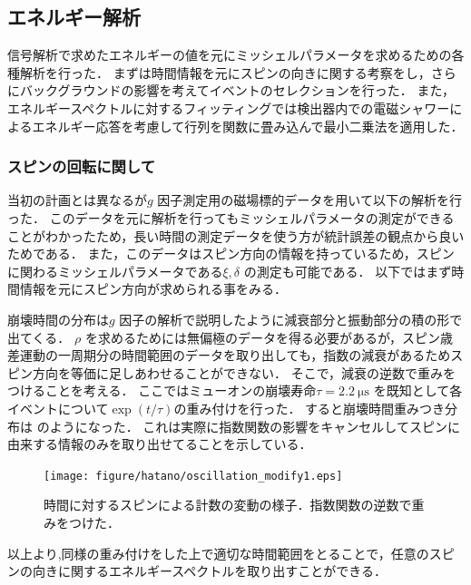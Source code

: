 %

\subsection{エネルギー解析}
信号解析で求めたエネルギーの値を元にミッシェルパラメータを求めるための各種解析を行った．
まずは時間情報を元にスピンの向きに関する考察をし，さらにバックグラウンドの影響を考えてイベントのセレクションを行った．
また，エネルギースペクトルに対するフィッティングでは検出器内での電磁シャワーによるエネルギー応答を考慮して行列を関数に畳み込んで最小二乗法を適用した．

\subsubsection{スピンの回転に関して}
当初の計画とは異なるが$g$ 因子測定用の磁場標的データを用いて以下の解析を行った．
このデータを元に解析を行ってもミッシェルパラメータの測定ができることがわかったため，長い時間の測定データを使う方が統計誤差の観点から良いためである．
また，このデータはスピン方向の情報を持っているため，スピンに関わるミッシェルパラメータである$\xi,\delta$ の測定も可能である．
以下ではまず時間情報を元にスピン方向が求められる事をみる．

崩壊時間の分布は$g$ 因子の解析で説明したように減衰部分と振動部分の積の形で出てくる．
$\rho$ を求めるためには無偏極のデータを得る必要があるが，スピン歳差運動の一周期分の時間範囲のデータを取り出しても，指数の減衰があるためスピン方向を等価に足しあわせることができない．
そこで，減衰の逆数で重みをつけることを考える．
ここではミューオンの崩壊寿命$\tau=2.2~\mathrm{\mu s}$ を既知として各イベントについて$\exp(t/\tau)$の重み付けを行った．
すると崩壊時間重みつき分布は のようになった．
これは実際に指数関数の影響をキャンセルしてスピンに由来する情報のみを取り出せてることを示している．

\begin{figure}[hbt]
\centering
\texttt{[image: figure/hatano/oscillation\_modify1.eps]}
\caption{時間に対するスピンによる計数の変動の様子．指数関数の逆数で重みをつけた．}
\label{hatano_fig:oscillation}
\end{figure}

以上より,同様の重み付けをした上で適切な時間範囲をとることで，任意のスピンの向きに関するエネルギースペクトルを取り出すことができる．

